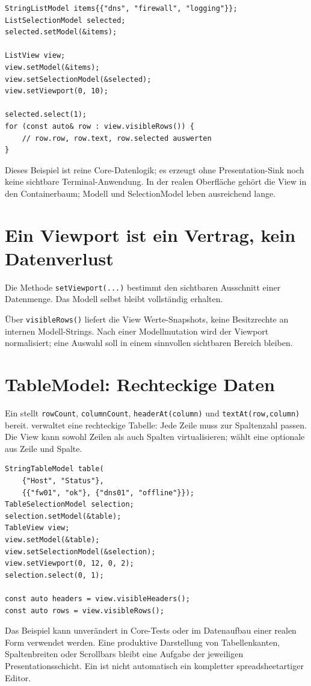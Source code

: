 \begin{lstlisting}[language=SASDCpp,caption={Sichtbaren Listenausschnitt an ein Modell binden}]
StringListModel items{{"dns", "firewall", "logging"}};
ListSelectionModel selected;
selected.setModel(&items);

ListView view;
view.setModel(&items);
view.setSelectionModel(&selected);
view.setViewport(0, 10);

selected.select(1);
for (const auto& row : view.visibleRows()) {
    // row.row, row.text, row.selected auswerten
}
\end{lstlisting}
Dieses Beispiel ist reine Core-Datenlogik;
es erzeugt ohne Presentation-Sink noch
keine sichtbare Terminal-Anwendung.
In der realen Oberfläche gehört die View
in den Containerbaum; Modell und
SelectionModel leben ausreichend lange.

\section{Ein Viewport ist ein Vertrag, kein Datenverlust}
Die Methode \texttt{setViewport(...)} bestimmt den
sichtbaren Ausschnitt einer Datenmenge.
Das Modell selbst bleibt vollständig erhalten.

Über \texttt{visibleRows()} liefert die View
Werte-Snapshots, keine Besitzrechte
an internen Modell-Strings.
Nach einer Modellmutation wird der Viewport
normalisiert; eine Auswahl soll in einem
sinnvollen sichtbaren Bereich bleiben.

\section{TableModel: Rechteckige Daten}
Ein  stellt \texttt{rowCount},
\texttt{columnCount}, \texttt{headerAt(column)}
und \texttt{textAt(row,column)} bereit.
 verwaltet eine
rechteckige Tabelle: Jede Zeile muss zur
Spaltenzahl passen. Die View kann
sowohl Zeilen als auch Spalten virtualisieren;
 wählt eine optionale
 aus Zeile und Spalte.

\begin{lstlisting}[language=SASDCpp]
StringTableModel table(
    {"Host", "Status"},
    {{"fw01", "ok"}, {"dns01", "offline"}});
TableSelectionModel selection;
selection.setModel(&table);
TableView view;
view.setModel(&table);
view.setSelectionModel(&selection);
view.setViewport(0, 12, 0, 2);
selection.select(0, 1);

const auto headers = view.visibleHeaders();
const auto rows = view.visibleRows();
\end{lstlisting}
Das Beispiel kann unverändert in Core-Tests
oder im Datenaufbau einer realen Form
verwendet werden. Eine produktive
Darstellung von Tabellenkanten,
Spaltenbreiten oder Scrollbars bleibt eine
Aufgabe der jeweiligen Presentationsschicht.
Ein  ist nicht automatisch
ein kompletter spreadsheetartiger Editor.

